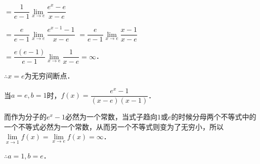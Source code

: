     $=\dfrac{1}{e-1}\lim\limits_{x\to e}\dfrac{e^x-e}{x-e}$
    
    $=\dfrac{e}{e-1}\lim\limits_{x\to e}\dfrac{e^{x-1}-1}{x-e}$ $=\dfrac{e}{e-1}\lim\limits_{x\to e}\dfrac{x-1}{x-e}$
    
    $=\dfrac{e(e-1)}{e-1}\lim\limits_{x\to e}\dfrac{1}{x-e}=\infty$．

$\therefore x=e$为无穷间断点．

    当$a=e,b=1$时，$f(x)=\dfrac{e^x-1}{(x-e)(x-1)}$．

    而作为分子的$e^x-1$必然为一个常数，当式子趋向$1$或$e$的时候分母两个不等式中的一个不等式必然为一个常数，从而另一个不等式则变为了无穷小，所以$\lim\limits_{x\to 1}f(x)=\lim\limits_{x\to e}f(x)=\infty$．

$\therefore a=1,b=e$．
